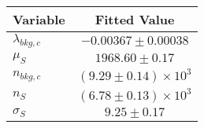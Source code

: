 \begin{tabular}[t]{lc}
\hline
Variable &Fitted Value\\
\hline\hline
$\lambda_{bkg,c}$&$-0.00367\pm0.00038$\\
\hline
$\mu_{S}$&$1968.60\pm0.17$\\
\hline
$n_{bkg,c}$&$(9.29\pm0.14)\times 10^3$\\
\hline
$n_{S}$&$(6.78\pm0.13)\times 10^3$\\
\hline
$\sigma_{S}$&$9.25\pm0.17$\\
\hline
\end{tabular}